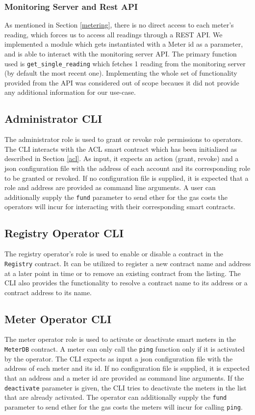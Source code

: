 \subsubsection*{Monitoring Server and Rest API}
As mentioned in Section \ref{metering}, there is no direct access to each meter's reading, which forces us to access all readings through a REST API. We implemented a module which gets instantiated with a Meter id as a parameter, and is able to interact with the monitoring server API. The primary function used is \texttt{get\_single\_reading} which fetches 1 reading from the monitoring server (by default the most recent one). Implementing the whole set of functionality provided from the API was considered out of scope becaues it did not provide any additional information for our use-case.

\subsection{Administrator CLI}
The administrator role is used to grant or revoke role permissions to operators. The CLI interacts with the ACL smart contract which has been initialized as described in Section \ref{acl}.  As input, it expects an action (grant, revoke) and a json configuration file with the address of each account and its corresponding role to be granted or revoked. If no configuration file is supplied, it is expected that a role and address are provided as command line arguments. A user can additionally supply the \texttt{fund} parameter to send ether for the gas costs the operators will incur for interacting with their corresponding smart contracts. 

\subsection{Registry Operator CLI}
The registry operator's role is used to enable or disable a contract in the \texttt{Registry} contract. It can be utilized to register a new contract name and address at a later point in time or to remove an existing contract from the listing. The CLI also provides the functionality to resolve a contract name to its address or a contract address to its name. 

\subsection{Meter Operator CLI} \label{meter-operator}
The meter operator role is used to activate or deactivate smart meters in the \texttt{MeterDB} contract. A meter can only call the \texttt{ping} function only if it is activated by the operator. The CLI expects as input a json configuration file with the address of each meter and its id. If no configuration file is supplied, it is expected that an address and a meter id are provided as command line arguments. If the \texttt{deactivate} parameter is given, the CLI tries to deactivate the meters in the list that are already activated. The operator can additionally supply the \texttt{fund} parameter to send ether for the gas costs the meters will incur for calling \texttt{ping}.

